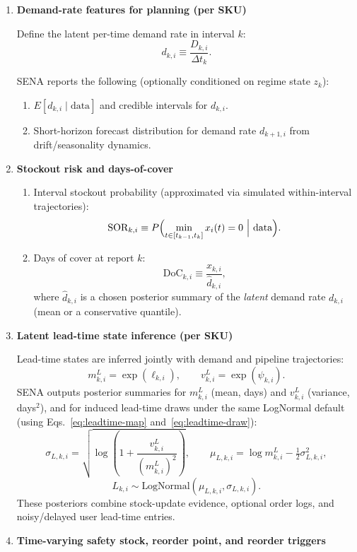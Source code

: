 \documentclass[11pt]{article}
\begin{document}
\begin{enumerate}
  \item \textbf{Demand-rate features for planning (per SKU)}

  Define the latent per-time demand rate in interval $k$:
  \[
    d_{k,i} \equiv \frac{D_{k,i}}{\Delta t_k}.
  \]

  SENA reports the following (optionally conditioned on regime state $z_k$):
  \begin{enumerate}
    \item $E[d_{k,i}\mid\text{data}]$ and credible intervals for $d_{k,i}$.
    \item Short-horizon forecast distribution for demand rate $d_{k+1,i}$ from drift/seasonality dynamics.
  \end{enumerate}

  \item \textbf{Stockout risk and days-of-cover}
  \begin{enumerate}
    \item Interval stockout probability (approximated via simulated within-interval trajectories):
    \[
      \text{SOR}_{k,i} \equiv P\Bigl(\min_{t\in[t_{k-1},t_k]} x_i(t)=0\ \Big|\ \text{data}\Bigr).
    \]
    \item Days of cover at report $k$:
    \[
      \text{DoC}_{k,i} \equiv \frac{x_{k,i}}{\hat d_{k,i}},
    \]
    where $\hat d_{k,i}$ is a chosen posterior summary of the \emph{latent} demand rate $d_{k,i}$ (mean or a conservative quantile).
  \end{enumerate}

  \item \textbf{Latent lead-time state inference (per SKU)}

  Lead-time states are inferred jointly with demand and pipeline trajectories:
  \[
    m^L_{k,i}=\exp(\ell_{k,i}),\qquad v^L_{k,i}=\exp(\psi_{k,i}).
  \]
  SENA outputs posterior summaries for $m^L_{k,i}$ (mean, days) and $v^L_{k,i}$ (variance, days$^2$), and for induced lead-time draws under the same LogNormal default (using Eqs.~\eqref{eq:leadtime-map} and~\eqref{eq:leadtime-draw}):
  \[
    \sigma_{L,k,i}=\sqrt{\log\!\left(1+\frac{v^L_{k,i}}{(m^L_{k,i})^2}\right)},\qquad
    \mu_{L,k,i}=\log m^L_{k,i}-\tfrac{1}{2}\sigma^2_{L,k,i},
  \]
  \[
    L_{k,i}\sim\text{LogNormal}(\mu_{L,k,i},\sigma_{L,k,i}).
  \]
  These posteriors combine stock-update evidence, optional order logs, and noisy/delayed user lead-time entries.

  \item \textbf{Time-varying safety stock, reorder point, and reorder triggers}


\end{enumerate}
\end{document}
